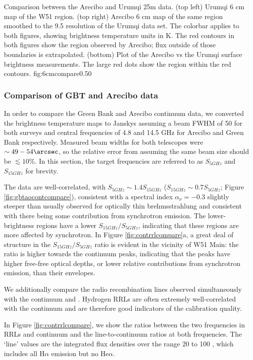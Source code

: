 {Comparison between the Arecibo and Urumqi 25m \citep{Sun2011b} data.
(top left) Urumqi 6 cm map of the W51 region.
(top right) Arecibo 6 cm map of the same region smoothed to the 9.5\arcmin
resolution of the Urumqi data set.  The colorbar applies to both figures,
showing brightness temperature units in K.  The red contours in both figures
show the region observed by Arecibo; flux outside of those boundaries is
extrapolated.
(bottom) Plot of the Arecibo vs the Urumqi surface brightness measurements.
The large red dots show the region within the red contours.
}
{fig:6cmcompare}{0.5}{0}


\subsubsection{Comparison of GBT and Arecibo data}
In order to compare the Green Bank and Arecibo continuum data, we converted
the brightness temperature maps to Janskys assuming a beam FWHM of 50\arcsec
for both surveys and central frequencies of 4.8 and 14.5 GHz for Arecibo and
Green Bank respectively.  Measured beam widths for both telescopes were
$\sim49-54\arcsec$, so the relative error from assuming the same beam size
should be $\lesssim10\%$.
In this section, the target frequencies are referred
to as $S_{5 GHz}$ and $S_{15 GHz}$ for brevity.

The data are well-correlated, with $S_{5 GHz} \sim 1.4 S_{15 GHz}$ ($S_{15 GHz}
\sim 0.7 S_{5 GHz}$; Figure \ref{fig:gbtaocontcompare}), consistent with a
spectral index $\alpha_\nu=-0.3$
slightly steeper than usually observed for optically thin brehmsstrahlung and
consistent with there being some contribution from synchrotron emission.  The
lower-brightness regions have a lower $S_{15 GHz}/S_{5 GHz}$, indicating that
these regions are more affected by synchrotron.  In Figure
\ref{fig:contrrlcompare}a, a great deal of structure in the $S_{15 GHz}/S_{5
GHz}$ ratio is evident in the vicinity of W51 Main: the ratio is higher towards
the continuum peaks, indicating that the peaks have higher free-free optical
depths, or lower relative contributions from synchrotron emission, than their
envelopes.

We additionally compare the radio recombination lines observed simultaneously
with the continuum and \formaldehyde.  Hydrogen RRLs are often extremely
well-correlated with the continuum and are therefore good indicators of the
calibration quality.

In Figure \ref{fig:contrrlcompare}, we show the ratios between the two
frequencies in RRLs and continuum and the line-to-continuum ratios at both
frequencies.  The `line' values are the integrated flux densities over the
range 20 to 100 \kms, which includes all H$\alpha$ emission but no He$\alpha$.

